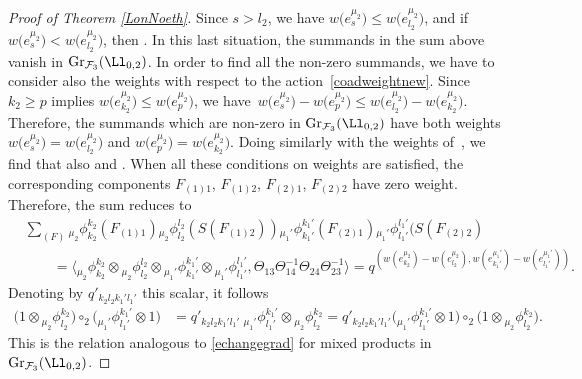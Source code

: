 \begin{proof}[Proof of Theorem \ref{LonNoeth}]
Since $s>l_2$, we have $w\big(e_{s}^{\mu_2}\big)\leq w\big(e_{l_2}^{\mu_2}\big)$, and if $w\big(e_{s}^{\mu_2}\big) < w\big(e_{l_2}^{\mu_2}\big)$, then . In this last situation, the summands  in the sum above vanish in ${\rm Gr}_{\mathcal{F}_3}(\Ll_{0,2})$. In order to find all the non-zero summands, we have to consider also the weights with respect to the action~\eqref{coadweightnew}. Since $k_2\geq p$ implies $w\big(e_{k_2}^{\mu_2}\big)\leq w\big(e_{p}^{\mu_2}\big)$, we have~${w\big(e_{s}^{\mu_2}\big)-w\big(e_{p}^{\mu_2}\big) \leq w\big(e_{l_2}^{\mu_2}\big)-w\big(e_{k_2}^{\mu_2}\big)}$. Therefore, the summands which are non-zero in ${{\rm Gr}_{\mathcal{F}_3}(\Ll_{0,2})}$ have both weights $w\big(e_{s}^{\mu_2}\big) = w\big(e_{l_2}^{\mu_2}\big)$ and $w\big(e_{p}^{\mu_2}\big) = w\big(e_{k_2}^{\mu_2}\big)$. Doing similarly with the weights of~, we find that also  and . When all these conditions on weights are satisfied, the corresponding components $F_{(1)1}$, $F_{(1)2}$, $F_{(2)1}$, $F_{(2)2}$ have zero weight. Therefore, the sum reduces to
\begin{align*}
&\sum_{(F)} {}_{{\mu_2}}\phi_{k_2}^{k_2}(F_{(1)1}){}_{{\mu_2}}\phi_{l_2}^{l_2}(S(F_{(1)2})){}_{{\mu_1'}}\phi_{k_1'}^{k_1'}(F_{(2)1}){}_{{\mu_1'}}\phi_{l_1'}^{l_1'}(S(F_{(2)2}) \\ & \qquad =\big\langle {}_{{\mu_2}}\phi_{k_2}^{k_2}\otimes {}_{{\mu_2}}\phi_{l_2}^{l_2}\otimes {}_{{\mu_1'}}\phi_{k_1'}^{k_1'}\otimes {}_{{\mu_1'}}\phi_{l_1'}^{l_1'}, \Theta_{13}\Theta_{14}^{-1}\Theta_{24}\Theta_{23}^{-1}\big\rangle = q^{(w(e_{k_2}^{\mu_2})-w(e_{l_2}^{\mu_2}), w(e_{k_1'}^{\mu_1'}) - w(e_{l_1'}^{\mu_1'}) )}.
\end{align*}
Denoting by $q'_{k_2l_2k_1'l_1'}$ this scalar, it follows
\begin{align*}
\big(1 \otimes {}_{{\mu_2}}\phi^{k_2}_{l_2}\big) \circ_2 \big({}_{{\mu_1'}}\phi^{k_1'}_{l_1'} \otimes 1\big) & = q'_{k_2l_2k_1'l_1'} \ {}_{{\mu_1'}}\phi^{k_1'}_{l_1'} \otimes {}_{{\mu_2}}\phi^{k_2}_{l_2} = q'_{k_2l_2k_1'l_1'} \big({}_{{\mu_1'}}\phi^{k_1'}_{l_1'} \otimes 1\big)\circ_2 \big(1 \otimes {}_{{\mu_2}}\phi^{k_2}_{l_2}\big).
\end{align*}
This is the relation analogous to \eqref{echangegrad} for mixed products in ${\rm Gr}_{\mathcal{F}_3}(\Ll_{0,2})$.


\end{proof}
